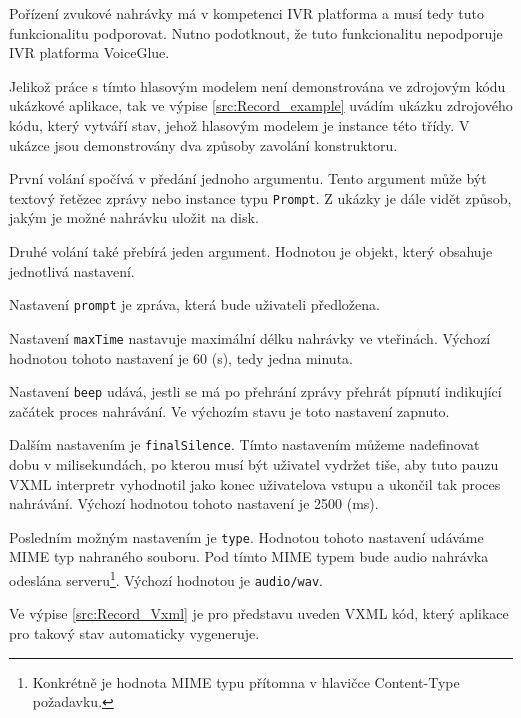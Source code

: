 \documentclass[ing,male,java,dept460]{diploma}						%
\begin{document}
Pořízení zvukové nahrávky má v kompetenci IVR platforma a musí tedy tuto funkcionalitu podporovat. Nutno podotknout, že tuto funkcionalitu nepodporuje IVR platforma VoiceGlue.

Jelikož práce s tímto hlasovým modelem není demonstrována ve zdrojovým kódu ukázkové aplikace, tak ve výpise \ref{src:Record_example} uvádím ukázku zdrojového kódu, který vytváří stav, jehož hlasovým modelem je instance této třídy. V ukázce jsou demonstrovány dva způsoby zavolání konstruktoru.

První volání spočívá v předání jednoho argumentu. Tento argument může být textový řetězec zprávy nebo instance typu \texttt{Prompt}. Z ukázky je dále vidět způsob, jakým je možné nahrávku uložit na disk.

Druhé volání také přebírá jeden argument. Hodnotou je objekt, který obsahuje jednotlivá nastavení.

Nastavení \texttt{prompt} je zpráva, která bude uživateli předložena.

Nastavení \texttt{maxTime} nastavuje maximální délku nahrávky ve vteřinách. Výchozí hodnotou tohoto nastavení je 60 (s), tedy jedna minuta.

Nastavení \texttt{beep} udává, jestli se má po přehrání zprávy přehrát pípnutí indikující začátek proces nahrávání. Ve výchozím stavu je toto nastavení zapnuto.

Dalším nastavením je \texttt{finalSilence}. Tímto nastavením můžeme nadefinovat dobu v milisekundách, po kterou musí být uživatel vydržet tiše, aby tuto pauzu VXML interpretr vyhodnotil jako konec uživatelova vstupu a ukončil tak proces nahrávání. Výchozí hodnotou tohoto nastavení je 2500 (ms).

Posledním možným nastavením je \texttt{type}. Hodnotou tohoto nastavení udáváme MIME typ nahraného souboru. Pod tímto MIME typem bude audio nahrávka odeslána serveru\footnote{Konkrétně je hodnota MIME typu přítomna v hlavičce Content-Type požadavku.}. Výchozí hodnotou je \texttt{audio/wav}.



Ve výpise \ref{src:Record_Vxml} je pro představu uveden VXML kód, který aplikace pro takový stav automaticky vygeneruje.


\end{document}
